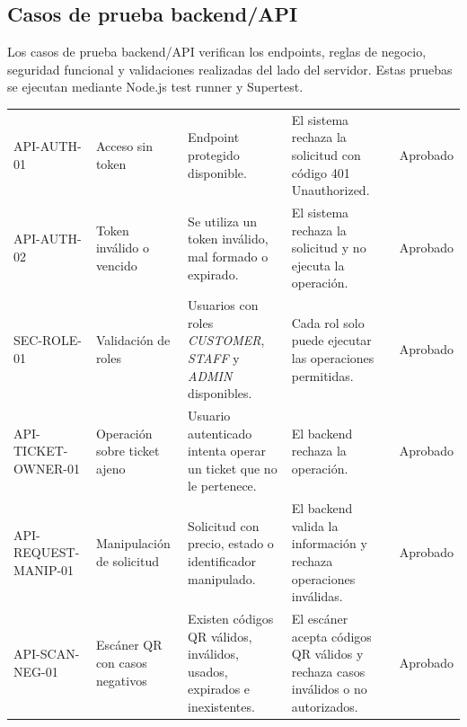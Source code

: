 \documentclass[12pt,letterpaper]{article}
\begin{document}
\subsection{Casos de prueba backend/API}

Los casos de prueba backend/API verifican los endpoints, reglas de negocio, seguridad funcional y validaciones realizadas del lado del servidor. Estas pruebas se ejecutan mediante Node.js test runner y Supertest.

\begin{table}[H]
\centering
\begingroup
\scriptsize
\setlength{\tabcolsep}{2.5pt}
\renewcommand{\arraystretch}{1.18}

\begin{tabularx}{\textwidth}{|
>{\raggedright\arraybackslash}p{2.5cm}|
>{\raggedright\arraybackslash}p{3.2cm}|
>{\raggedright\arraybackslash}X|
>{\raggedright\arraybackslash}p{3.6cm}|
>{\centering\arraybackslash}p{1.5cm}|}
\hline
\multicolumn{1}{|>{\centering\arraybackslash}m{2.5cm}|}{\textbf{ID}} &
\multicolumn{1}{>{\centering\arraybackslash}m{3.2cm}|}{\textbf{Caso}} &
\multicolumn{1}{>{\centering\arraybackslash}m{3.5cm}|}{\textbf{Precondiciones}} &
\multicolumn{1}{>{\centering\arraybackslash}m{3.6cm}|}{\textbf{Resultado esperado}} &
\multicolumn{1}{>{\centering\arraybackslash}m{1.5cm}|}{\textbf{Estado}} \\
\hline
API-AUTH-01 & Acceso sin token & Endpoint protegido disponible. & El sistema rechaza la solicitud con código 401 Unauthorized. & Aprobado \\
\hline
API-AUTH-02 & Token inválido o vencido & Se utiliza un token inválido, mal formado o expirado. & El sistema rechaza la solicitud y no ejecuta la operación. & Aprobado \\
\hline
SEC-ROLE-01 & Validación de roles & Usuarios con roles \textit{CUSTOMER}, \textit{STAFF} y \textit{ADMIN} disponibles. & Cada rol solo puede ejecutar las operaciones permitidas. & Aprobado \\
\hline
API-TICKET-OWNER-01 & Operación sobre ticket ajeno & Usuario autenticado intenta operar un ticket que no le pertenece. & El backend rechaza la operación. & Aprobado \\
\hline
API-REQUEST-MANIP-01 & Manipulación de solicitud & Solicitud con precio, estado o identificador manipulado. & El backend valida la información y rechaza operaciones inválidas. & Aprobado \\
\hline
API-SCAN-NEG-01 & Escáner QR con casos negativos & Existen códigos QR válidos, inválidos, usados, expirados e inexistentes. & El escáner acepta códigos QR válidos y rechaza casos inválidos o no autorizados. & Aprobado \\

\end{tabularx}
\end{table}
\end{document}
